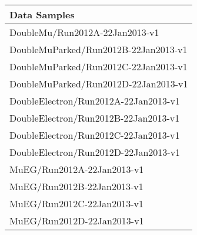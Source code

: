 \begin{table*}
\begin{center}
\label{tab:datasamples}
\begin{tabular}{l}
\hline  \textbf{Data Samples} \\
\hline  DoubleMu/Run2012A-22Jan2013-v1\\
DoubleMuParked/Run2012B-22Jan2013-v1\\
DoubleMuParked/Run2012C-22Jan2013-v1\\
DoubleMuParked/Run2012D-22Jan2013-v1\\
DoubleElectron/Run2012A-22Jan2013-v1\\
DoubleElectron/Run2012B-22Jan2013-v1\\
DoubleElectron/Run2012C-22Jan2013-v1\\
DoubleElectron/Run2012D-22Jan2013-v1\\
MuEG/Run2012A-22Jan2013-v1\\
MuEG/Run2012B-22Jan2013-v1\\
MuEG/Run2012C-22Jan2013-v1\\
MuEG/Run2012D-22Jan2013-v1\\
\hline
\end{tabular}
\end{center}
\end{table*}

